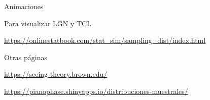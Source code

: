 \documentclass{beamer}
\theoremstyle{definition}
\begin{document}
\begin{frame}{\color{rosee}Animaciones} 

Para visualizar LGN y TCL

\url{https://onlinestatbook.com/stat_sim/sampling_dist/index.html}

\vspace{18pt}

Otras páginas

\url{https://seeing-theory.brown.edu/}

 \url{https://pianophase.shinyapps.io/distribuciones-muestrales/}
\end{frame}

%       
%       
%       
%       
% 
%     
\end{document}
